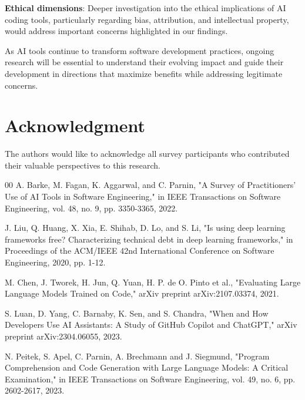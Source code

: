 \documentclass[conference]{IEEEtran}
\begin{document}
\textbf{Ethical dimensions}: Deeper investigation into the ethical implications of AI coding tools, particularly regarding bias, attribution, and intellectual property, would address important concerns highlighted in our findings.

As AI tools continue to transform software development practices, ongoing research will be essential to understand their evolving impact and guide their development in directions that maximize benefits while addressing legitimate concerns.

\section*{Acknowledgment}
The authors would like to acknowledge all survey participants who contributed their valuable perspectives to this research.

\begin{thebibliography}{00}
 A. Barke, M. Fagan, K. Aggarwal, and C. Parnin, "A Survey of Practitioners' Use of AI Tools in Software Engineering," in IEEE Transactions on Software Engineering, vol. 48, no. 9, pp. 3350-3365, 2022.

 J. Liu, Q. Huang, X. Xia, E. Shihab, D. Lo, and S. Li, "Is using deep learning frameworks free? Characterizing technical debt in deep learning frameworks," in Proceedings of the ACM/IEEE 42nd International Conference on Software Engineering, 2020, pp. 1-12.

 M. Chen, J. Tworek, H. Jun, Q. Yuan, H. P. de O. Pinto et al., "Evaluating Large Language Models Trained on Code," arXiv preprint arXiv:2107.03374, 2021.

 S. Luan, D. Yang, C. Barnaby, K. Sen, and S. Chandra, "When and How Developers Use AI Assistants: A Study of GitHub Copilot and ChatGPT," arXiv preprint arXiv:2304.06055, 2023.

 N. Peitek, S. Apel, C. Parnin, A. Brechmann and J. Siegmund, "Program Comprehension and Code Generation with Large Language Models: A Critical Examination," in IEEE Transactions on Software Engineering, vol. 49, no. 6, pp. 2602-2617, 2023.
\end{thebibliography}
\end{document}
